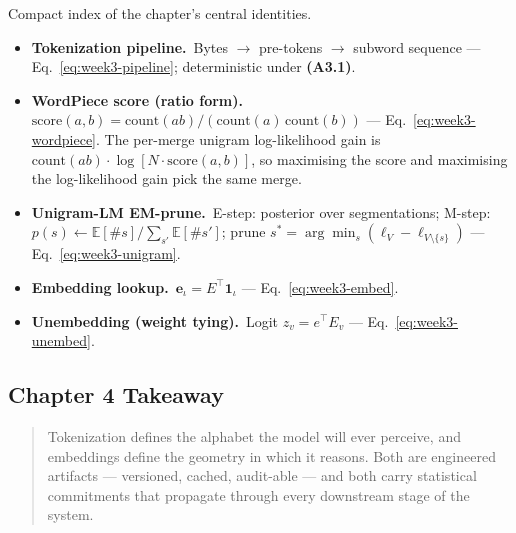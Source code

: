 \begin{derivledger}
Compact index of the chapter's central identities.
\begin{itemize}
  \item \textbf{Tokenization pipeline.}\
        Bytes $\to$ pre-tokens $\to$ subword sequence
        --- Eq.~\eqref{eq:week3-pipeline}; deterministic under
        \textbf{(A3.1)}.
  \item \textbf{WordPiece score (ratio form).}\
        $\mathrm{score}(a,b) = \mathrm{count}(ab)/(\mathrm{count}(a)\,\mathrm{count}(b))$
        --- Eq.~\eqref{eq:week3-wordpiece}. The per-merge unigram
        log-likelihood gain is $\mathrm{count}(ab)\cdot
        \log[N\cdot\mathrm{score}(a,b)]$, so maximising the score
        and maximising the log-likelihood gain pick the same merge.
  \item \textbf{Unigram-LM EM-prune.}\
        E-step: posterior over segmentations;
        M-step: $p(s) \leftarrow \mathbb{E}[\#s] / \sum_{s'} \mathbb{E}[\#s']$;
        prune $s^* = \arg\min_s (\ell_V - \ell_{V \setminus \{s\}})$
        --- Eq.~\eqref{eq:week3-unigram}.
  \item \textbf{Embedding lookup.}\
        $\mathbf{e}_\iota = E^\top \mathbf{1}_\iota$ --- Eq.~\eqref{eq:week3-embed}.
  \item \textbf{Unembedding (weight tying).}\
        Logit $z_v = e^\top E_v$ --- Eq.~\eqref{eq:week3-unembed}.
\end{itemize}
\end{derivledger}

\subsection{Chapter 4 Takeaway}

\begin{quote}
Tokenization defines the alphabet the model will ever perceive, and
embeddings define the geometry in which it reasons. Both are
engineered artifacts — versioned, cached, audit-able — and both carry
statistical commitments that propagate through every downstream
stage of the system.
\end{quote}
